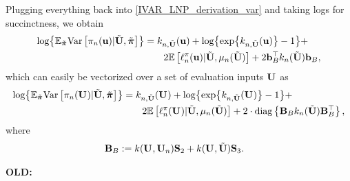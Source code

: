 \documentclass[12pt]{article}
\begin{document}
Plugging everything back into \ref{IVAR_LNP_derivation_var} and taking logs for succinctness, we obtain 
\begin{align*}
\Log{\E_{\tilde{\boldsymbol{\postDens}}} \Var\left[\unPostPred(\bpar) | \batchMat, \tilde{\boldsymbol{\postDens}} \right]} 
&= \logUnPostKerPred[\designIdx, \batchMat](\bpar) + \Log{\Exp{\logUnPostKerPred[\designIdx, \batchMat](\bpar)} - 1} + \\
&\qquad2 \E\left[\logUnPostPred(\bpar) | \batchMat, \logUnPostMeanPred(\batchMat) \right] + 2\bb_{\Nbatch}^\top \logUnPostKerPred(\batchMat) \bb_{\Nbatch},
\end{align*}
which can easily be vectorized over a set of evaluation inputs $\designMat[]$ as 
\begin{align*}
\Log{\E_{\tilde{\boldsymbol{\postDens}}} \Var\left[\unPostPred(\designMat[]) | \batchMat, \tilde{\boldsymbol{\postDens}} \right]} 
&= \logUnPostKerPred[\designIdx, \batchMat](\designMat[]) + \Log{\Exp{\logUnPostKerPred[\designIdx, \batchMat](\designMat[])} - 1} + \\
&\qquad2 \E\left[\logUnPostPred(\designMat[]) | \batchMat, \logUnPostMeanPred(\batchMat) \right] + 2 \cdot \text{diag}\left\{\mathbf{B}_{\Nbatch} \logUnPostKerPred(\batchMat) \mathbf{B}_{\Nbatch}^\top  \right\},
\end{align*}
where
\begin{align*}
\mathbf{B}_{\Nbatch} &:=   \GPKer(\designMat[], \designMat) \bS_2  + \GPKer(\designMat[], \batchMat) \bS_{3}.
\end{align*}

\bigskip
\noindent
\textbf{OLD:}
\end{document}
